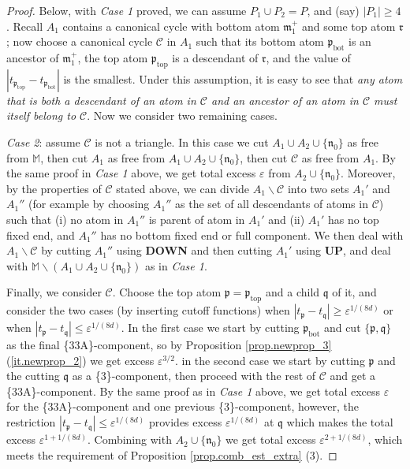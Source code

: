 \documentclass[10pt, reqno]{amsart}
\newcommand{\Mb}{\mathbb M}
\newcommand{\Cc}{\mathcal C}
\newcommand{\mf}{\mathfrak m}
\newcommand{\pf}{\mathfrak p}
\newcommand{\rf}{\mathfrak r}
\newcommand{\qf}{\mathfrak q}
\newcommand{\nf}{\mathfrak n}
\theoremstyle{definition}
\theoremstyle{remark}
\numberwithin{equation}{section}
\begin{document}
\begin{proof}
\medskip
Below, with \emph{Case 1} proved, we can assume $P_1\cup P_2=P$, and (say) $|P_1|\geq 4$. Recall $A_1$ contains a canonical cycle with bottom atom $\mf_1^+$ and some top atom $\rf$; now choose a canonical cycle $\Cc$ in $A_1$ such that its bottom atom $\pf_{\mathrm{bot}}$ is an ancestor of $\mf_1^+$, the top atom $\pf_{\mathrm{top}}$ is a descendant of $\rf$, and the value of $|t_{\pf_{\mathrm{top}}}-t_{\pf_{\mathrm{bot}}}|$ is the smallest. Under this assumption, it is easy to see that \emph{any atom that is both a descendant of an atom in $\Cc$ and an ancestor of an atom in $\Cc$ must itself belong to $\Cc$}. Now we consider two remaining cases.

\emph{Case 2}: assume $\Cc$ is not a triangle. In this case we cut $A_1\cup A_2\cup\{\nf_0\}$ as free from $\Mb$, then cut $A_1$ as free from $A_1\cup A_2\cup\{\nf_0\}$, then cut $\Cc$ as free from $A_1$. By the same proof in \emph{Case 1} above, we get total excess $\varepsilon$ from $A_2\cup \{\nf_0\}$. Moreover, by the properties of $\Cc$ stated above, we can divide $A_1\backslash \Cc$ into two sets $A_1'$ and $A_1''$ (for example by choosing $A_1''$ as the set of all descendants of atoms in $\Cc$) such that (i) no atom in $A_1''$ is parent of atom in $A_1'$ and (ii) $A_1'$ has no top fixed end, and $A_1''$ has no bottom fixed end or full component. We then deal with $A_1\backslash\Cc$ by cutting $A_1''$ using \textbf{DOWN} and then cutting $A_1'$ using \textbf{UP}, and deal with $\Mb\backslash (A_1\cup A_2\cup\{\nf_0\})$ as in \emph{Case 1}.

Finally, we consider $\Cc$. Choose the top atom $\pf=\pf_{\mathrm{top}}$ and a child $\qf$ of it, and consider the two cases (by inserting cutoff functions) when $|t_{\pf}-t_\qf|\geq \varepsilon^{1/(8d)}$ or when $|t_{\pf}-t_\qf|\leq \varepsilon^{1/(8d)}$. In the first case we start by cutting $\pf_{\mathrm{bot}}$ and cut $\{\pf,\qf\}$ as the final \{33A\}-component, so by Proposition \ref{prop.newprop_3} (\ref{it.newprop_2}) we get excess $\varepsilon^{3/2}$. in the second case we start by cutting $\pf$ and the cutting $\qf$ as a \{3\}-component, then proceed with the rest of $\Cc$ and get a \{33A\}-component. By the same proof as in \emph{Case 1} above, we get total excess $\varepsilon$ for the \{33A\}-component and one previous \{3\}-component, however, the restriction $|t_{\pf}-t_\qf|\leq \varepsilon^{1/(8d)}$ provides excess $\varepsilon^{1/(8d)}$ at $\qf$ which makes the total excess $\varepsilon^{1+1/(8d)}$. Combining with $A_2\cup \{\nf_0\}$ we get total excess $\varepsilon^{2+1/(8d)}$, which meets the requirement of Proposition \ref{prop.comb_est_extra} (3).


\end{proof}
\end{document}
